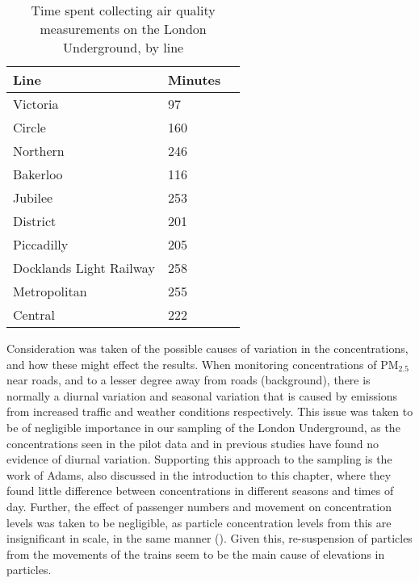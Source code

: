\begin{table}[H]
\centering
    \begin{tabular}{ | l | l | l |}
    \hline 
    \bfseries{Line} & \bfseries{Minutes} \\ \hline
       Victoria                & 97    \\ \hline
        Circle                  & 160   \\ \hline
        Northern                & 246   \\ \hline
        Bakerloo                & 116   \\ \hline
        Jubilee                 & 253   \\ \hline
        District                & 201   \\ \hline
        Piccadilly              & 205   \\ \hline
        Docklands Light Railway & 258   \\ \hline
        Metropolitan            & 255   \\ \hline
        Central                 & 222   \\ \hline
        \end{tabular}
\caption{Time spent collecting air quality measurements on the London Underground, by line}
\label{tab:time_on_the_underground}
\end{table}

Consideration was taken of the possible causes of variation in the concentrations, and how these might effect the results. When monitoring concentrations of PM$_{2.5}$ near roads, and to a lesser degree away from roads (background), there is normally a diurnal variation and seasonal variation that is caused by emissions from increased traffic and weather conditions respectively. This issue was taken to be of negligible importance in our sampling of the London Underground, as the concentrations seen in the pilot data and in previous studies have found no evidence of diurnal variation. Supporting this approach to the sampling is the work of Adams, also discussed in the introduction to this chapter, where they found little difference between concentrations in different seasons and times of day. Further, the effect of passenger numbers and movement on concentration levels was taken to be negligible, as particle concentration levels from this are insignificant in scale, in the same manner (\cite{Ferro2004a}). Given this, re-suspension of particles from the movements of the trains seem to be the main cause of elevations in particles.


